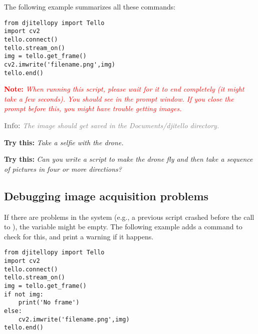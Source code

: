 \documentclass[12pt]{article}
\newcommand{\textsfbf}[1]{\textsf{\textbf{#1}}}
\newcommand{\info}[1]{\par\textcolor{gray}{\textsfbf{Info:} \emph{#1}}}
\newcommand{\trythis}[1]{\par\textcolor{DodgerBlue4}{\textsfbf{Try this:} \emph{#1}}}
\newcommand{\warning}[1]{\par\textcolor{red}{\textsfbf{Note:} \emph{#1}}}
\begin{document}
The following example summarizes all these commands:
\begin{lstlisting}
from djitellopy import Tello
import cv2
tello.connect()
tello.stream_on()
img = tello.get_frame()
cv2.imwrite('filename.png',img)
tello.end()
\end{lstlisting}
\warning{When running this script, please wait for it to end completely (it might take a few seconds). You should see \var{update_frame: terminating} in the prompt window. If you close the prompt before this, you might have trouble getting images.}

\info{The image should get saved in the \emph{Documents/djitello} directory.}

\trythis{Take a selfie with the drone.}
\trythis{Can you write a script to make the drone fly and then take a sequence of pictures in four or more directions?}

\subsection{Debugging image acquisition problems}
If there are problems in the system (e.g., a previous script crashed before the call to ), the variable  might be empty. The following example adds a  command to check for this, and print a warning if it happens.

\begin{lstlisting}
from djitellopy import Tello
import cv2
tello.connect()
tello.stream_on()
img = tello.get_frame()
if not img:
    print('No frame')
else:
    cv2.imwrite('filename.png',img)
tello.end()
\end{lstlisting}
\end{document}
